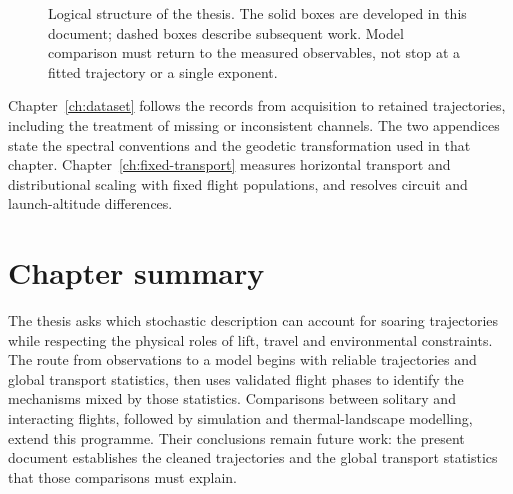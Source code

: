 \begin{figure}[H]
  \caption{Logical structure of the thesis. The solid boxes are developed in this document;
  dashed boxes describe subsequent work. Model comparison must return to the measured
  observables, not stop at a fitted trajectory or a single exponent.}
  \label{fig:thesis-structure}
\end{figure}

Chapter~\ref{ch:dataset} follows the records from acquisition to retained trajectories,
including the treatment of missing or inconsistent channels. The two appendices
state the spectral conventions and the geodetic transformation used in that chapter.
Chapter~\ref{ch:fixed-transport} measures horizontal transport and distributional scaling
with fixed flight populations, and resolves circuit and launch-altitude differences.

\section{Chapter summary}
The thesis asks which stochastic description can account for soaring trajectories while
respecting the physical roles of lift, travel and environmental constraints. The route
from observations to a model begins with reliable trajectories and global transport
statistics, then uses validated flight phases to identify the mechanisms mixed by those
statistics. Comparisons between solitary and interacting flights, followed by simulation
and thermal-landscape modelling, extend this programme. Their conclusions remain future
work: the present document establishes the cleaned trajectories and the global
transport statistics that those comparisons must explain.
